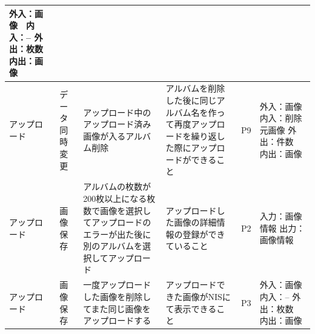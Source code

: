 \begin{table}[htbp]
\begin{tabular}{|p{8em}|p{7em}|p{9em}|p{9em}|p{3em}|p{12em}|}
外入：画像　内入：--
外出：枚数　内出：画像 \bigstrut\\
    \hline
    アップロード & データ同時変更 & アップロード中のアップロード済み画像が入るアルバム削除 & アルバムを削除した後に同じアルバム名を作って再度アップロードを繰り返した際にアップロードができること & P9    & 外入：画像　内入：削除元画像
外出：件数　内出：画像 \bigstrut\\
    \hline
    アップロード & 画像保存  & アルバムの枚数が200枚以上になる枚数で画像を選択してアップロードのエラーが出た後に別のアルバムを選択してアップロード & アップロードした画像の詳細情報の登録ができていること & P2    & 入力：画像情報
出力：画像情報 \bigstrut\\
    \hline
    アップロード & 画像保存  & 一度アップロードした画像を削除してまた同じ画像をアップロードする & アップロードできた画像がNISにて表示できること & P3    & 外入：画像　内入：--
外出：枚数　内出：画像 \bigstrut\\
    \hline
    \end{tabular}%
  \label{tab:D-4-ER2-4}%
\end{table}%



